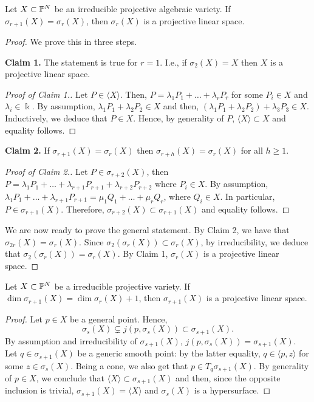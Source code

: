 \begin{lemma}
    \label{geometrySecants-lemma-palatini_1}
    Let $X\subset \mathbb{P}^N$ be an irreducible projective algebraic variety. If $\sigma_{r+1}(X) = \sigma_r(X)$, then $\sigma_r(X)$ is a projective linear space. 
\begin{proof}
    We prove this in three steps.

    {\bf Claim 1.} The statement is true for $r = 1$. I.e., if $\sigma_2(X) = X$ then $X$ is a projective linear space.
    \begin{proof}[Proof of Claim 1.]
        Let $P \in \langle X \rangle$. Then, $P = \lambda_1P_1 + \ldots + \lambda_rP_r$ for some $P_i \in X$ and $\lambda_i \in \Bbbk$. By assumption, $\lambda_1P_1 + \lambda_2P_2 \in X$ and then, $(\lambda_1P_1 + \lambda_2P_2) + \lambda_3P_3 \in X$. Inductively, we deduce that $P \in X$. Hence, by generality of $P$, $\langle X \rangle \subset X$ and equality follows. 
    \end{proof}

    {\bf Claim 2.} If $\sigma_{r+1}(X) = \sigma_r(X)$ then $\sigma_{r+h}(X) = \sigma_r(X)$ for all $h \geq 1$. 
    \begin{proof}[Proof of Claim 2.]
        Let $P \in \sigma_{r+2}(X)$, then $P = \lambda_1P_1 + \ldots + \lambda_{r+1}P_{r+1} + \lambda_{r+2}P_{r+2}$ where $P_i \in X$. By assumption, $\lambda_1P_1 + \ldots + \lambda_{r+1}P_{r+1} = \mu_1Q_1 + \ldots + \mu_rQ_r$, where $Q_i \in X$. In particular, $P \in \sigma_{r+1}(X)$. Therefore, $\sigma_{r+2}(X) \subset \sigma_{r+1}(X)$ and equality follows. 
    \end{proof}

    We are now ready to prove the general statement. By Claim 2, we have that $\sigma_{2r}(X) = \sigma_r(X)$. Since $\sigma_2(\sigma_r(X)) \subset \sigma_r(X)$, by irreducibility, we deduce that $\sigma_2(\sigma_r(X)) = \sigma_r(X)$. By Claim 1, $\sigma_r(X)$ is a projective linear space. 
\end{proof}
\end{lemma}


\begin{lemma}
    \label{geometrySecants-lemma-palatini_2}
    Let $X\subset \mathbb{P}^N$ be a irreducible projective variety. If $\dim\sigma_{r+1}(X) = \dim\sigma_r(X)+1$, then $\sigma_{r+1}(X)$ is a projective linear space. 
\begin{proof}
    Let $p \in X$ be a general point. Hence,
    \[
        \sigma_s(X) \subsetneq j(p, \sigma_s(X)) \subset \sigma_{s+1}(X).  
    \]
    By assumption and irreducibility of $\sigma_{s+1}(X)$, $j(p, \sigma_s(X)) = \sigma_{s+1}(X)$. Let $q \in \sigma_{s+1}(X)$ be a generic smooth point: by the latter equality, $q \in \langle p,z \rangle$ for some $z \in \sigma_s(X)$. Being a cone, we also get that $p \in T_q\sigma_{s+1}(X)$. By generality of $p \in X$, we conclude that $\langle X \rangle \subset \sigma_{s+1}(X)$ and then, since the opposite inclusion is trivial, $\sigma_{s+1}(X) = \langle X \rangle$ and $\sigma_s(X)$ is a hypersurface. 
\end{proof}
\end{lemma}


